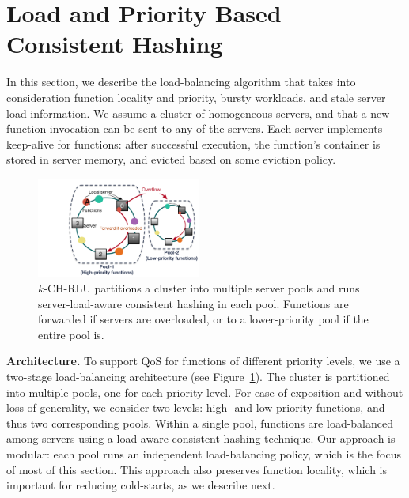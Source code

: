 \section{Load and Priority Based Consistent Hashing} %
\label{sec:chrlu}

In this section, we describe the load-balancing algorithm that takes into consideration function locality and priority, bursty workloads, and stale server load information. 
We assume a cluster of homogeneous servers, and that a new function invocation can be sent to any of the servers.
Each server implements keep-alive for functions: after successful execution, the function's container is stored in server memory, and evicted based on some eviction policy.

\begin{figure}
\centering
  \hspace{-1.5cm}\includegraphics[width=0.48\textwidth]{../figs/k-rlu2.pdf}
  \caption{$k$-CH-RLU partitions a cluster into multiple server pools and runs server-load-aware consistent hashing in each pool. Functions are forwarded if servers are overloaded, or to a lower-priority pool if the entire pool is.}
  \label{fig:2-pool-arch}
\end{figure}

\noindent \textbf{Architecture.}
To support QoS for functions of different priority levels, we use a two-stage load-balancing architecture (see Figure~\ref{fig:2-pool-arch}). 
The cluster is partitioned into multiple pools, one for each priority level.
For ease of exposition and without loss of generality, we consider two levels: high- and low-priority functions, and thus two corresponding pools. 
Within a single pool, functions are load-balanced among servers using a load-aware consistent hashing technique. 
Our approach is modular: each pool runs an independent load-balancing policy, which is the focus of most of this section. 
This approach also preserves function locality, which is important for reducing cold-starts, as we describe next.  




